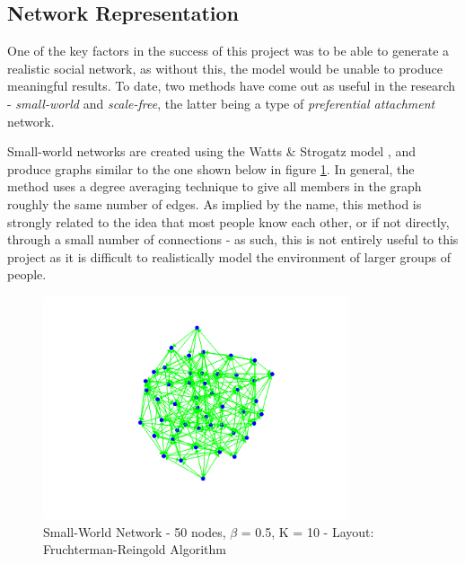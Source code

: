 \documentclass[]{article}
\begin{document}
\subsection{Network Representation}
One of the key factors in the success of this project was to be able to generate a realistic social network, as without this, the model would be unable to produce meaningful results. To date, two methods have come out as useful in the research - \emph{small-world} and \emph{scale-free}, the latter being a type of \emph{preferential attachment} network.

Small-world networks are created using the Watts \& Strogatz model \cite{WSTech}, and produce graphs similar to the one shown below in figure \ref{fig:small-world}. In general, the method uses a degree averaging technique to give all members in the graph roughly the same number of edges. As implied by the name, this method is strongly related to the idea that most people know each other, or if not directly, through a small number of connections - as such, this is not entirely useful to this project as it is difficult to realistically model the environment of larger groups of people. 

\begin{figure}
	\centering
		\includegraphics[width=0.80\textwidth]{small-world.png}
	\caption{Small-World Network - 50 nodes, $\beta$ = 0.5, K = 10 - Layout: Fruchterman-Reingold Algorithm}
	\label{fig:small-world}
\end{figure}
\end{document}
